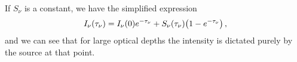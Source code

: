 \documentclass[main.tex]{subfiles}
\begin{document}
If \(S_{\nu } \) is a constant, we have the simplified expression 
%
\begin{align}
I_{\nu } (\tau_{\nu }) = I_{\nu }(0) e^{-\tau_{\nu }} 
+ S_{\nu } (\tau_{\nu }) \qty(1 - e^{-\tau_{\nu }})
\,,
\end{align}
%
and we can see that for large optical depths the intensity is dictated purely by the source at that point. 
\end{document}
